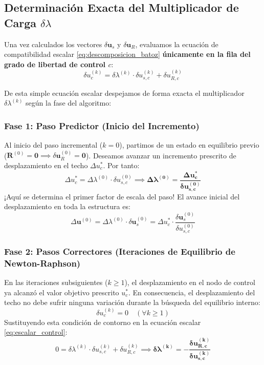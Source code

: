 \documentclass[11pt,letterpaper]{article}
\begin{document}
\subsection{Determinación Exacta del Multiplicador de Carga \texorpdfstring{$\delta \lambda$}{delta lambda}}

Una vez calculados los vectores $\delta \mathbf{u}_s$ y $\delta \mathbf{u}_R$, evaluamos la ecuación de compatibilidad escalar \eqref{eq:descomposicion_batoz} \textbf{únicamente en la fila del grado de libertad de control $c$}:
\begin{equation}
    \delta u_c^{(k)} = \delta \lambda^{(k)} \cdot \delta u_{s,c}^{(k)} + \delta u_{R,c}^{(k)}
    \label{eq:escalar_control}
\end{equation}

De esta simple ecuación escalar despejamos de forma exacta el multiplicador $\delta \lambda^{(k)}$ según la fase del algoritmo:

\subsubsection{Fase 1: Paso Predictor (Inicio del Incremento)}
Al inicio del paso incremental ($k = 0$), partimos de un estado en equilibrio previo ($\mathbf{R}^{(0)} = \mathbf{0} \implies \delta \mathbf{u}_R^{(0)} = \mathbf{0}$). Deseamos avanzar un incremento prescrito de desplazamiento en el techo $\Delta u_c^*$. Por tanto:
\begin{equation}
    \Delta u_c^* = \Delta \lambda^{(0)} \cdot \delta u_{s,c}^{(0)} \implies \mathbf{\Delta \lambda^{(0)} = \frac{\Delta u_c^*}{\delta u_{s,c}^{(0)}}}
    \label{eq:predictor_lambda}
\end{equation}
¡Aquí se determina el primer factor de escala del paso! El avance inicial del desplazamiento en toda la estructura es:
\begin{equation}
    \Delta \mathbf{u}^{(0)} = \Delta \lambda^{(0)} \cdot \delta \mathbf{u}_s^{(0)} = \Delta u_c^* \cdot \frac{\delta \mathbf{u}_s^{(0)}}{\delta u_{s,c}^{(0)}}
\end{equation}

\subsubsection{Fase 2: Pasos Correctores (Iteraciones de Equilibrio de Newton-Raphson)}
En las iteraciones subsiguientes ($k \ge 1$), el desplazamiento en el nodo de control ya alcanzó el valor objetivo prescrito $u_c^*$. En consecuencia, el desplazamiento del techo no debe sufrir ninguna variación durante la búsqueda del equilibrio interno:
\begin{equation}
    \delta u_c^{(k)} = 0 \quad (\forall k \ge 1)
\end{equation}
Sustituyendo esta condición de contorno en la ecuación escalar \eqref{eq:escalar_control}:
\begin{equation}
    0 = \delta \lambda^{(k)} \cdot \delta u_{s,c}^{(k)} + \delta u_{R,c}^{(k)} \implies \mathbf{\delta \lambda^{(k)} = -\frac{\delta u_{R,c}^{(k)}}{\delta u_{s,c}^{(k)}}}
    \label{eq:corrector_lambda}
\end{equation}
\end{document}
